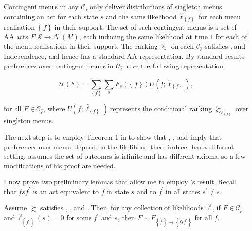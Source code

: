 Contingent menus in any \( \mathcal{C}_{\widehat{\ell}} \) only deliver distributions of singleton menus containing an act for each state \( s \) and the same likelihood \( \widehat{\ell}_{\left\{ f \right\}} \) for each menu realisation \( \left\{ f \right\} \) in their support. The set of such contingent menus is a set of AA acts \( F : \mathcal{S} \rightarrow \Delta^{\circ} \left( M \right) \), each inducing the same likelihood at time \( 1 \) for each of the menu realisations in their support. The ranking \( \succsim \) on each \( \mathcal{C}_{\widehat{\ell}} \) satisfies ,  and Independence, and hence has a standard AA representation. By standard results \citep[Theorem 13.1 pag. 176]{fishburnUtilityTheoryDecision1970} preferences over contingent menus in \( \mathcal{C}_{\widehat{\ell}} \) have the following representation

\begin{equation}\label{eq:singfirst}
	\mathscr{U} \left( F \right) = \sum_{\left\{ f \right\}} \sum_s F_s \left( \left\{ f \right\} \right) U \left( f ; \widehat{\ell}_{\left\{ f \right\}} \right) ,
\end{equation}

for all \( F \in \mathcal{C}_{\widehat{\ell}} \), where \( U \left( f ; \widehat{\ell}_{\left\{ f \right\}} \right) \) represents the conditional ranking \( \succsim_{\widehat{\ell}_{\left\{ f \right\}}} \) over singleton menus.

The next step is to employ Theorem 1 in \cite{liangInformationdependentExpectedUtility2017} to show that , ,  and  imply that preferences over menus depend on the likelihood these induce. \cite{liangInformationdependentExpectedUtility2017} has a different setting, assumes the set of outcomes is infinite and has different axioms, so a few modifications of his proof are needed.

I now prove two preliminary lemmas that allow me to employ \citeauthor{liangInformationdependentExpectedUtility2017}'s result. Recall that \( f s f^{\prime} \) is an act equivalent to \( f \) in state \( s \) and to \( f^{\prime} \) in all states \( s^{\prime} \neq s \).

\begin{lemma}\label{lem:pre1}
	Assume \( \succsim \) satisfies , , and . Then, for any collection of likelihoods \( \widehat{\ell} \), if \( F \in \mathcal{C}_{\widehat{\ell}}  \) and \( \widehat{\ell}_{\left\{ f^{\prime} \right\}} \left( s \right) = 0 \) for some \( f^{\prime} \) and \( s \), then \( F \sim F_{ \left\{ f^{\prime} \right\} \rightarrow \left\{ f s f^{\prime} \right\}} \) for all \( f \).
\end{lemma}

